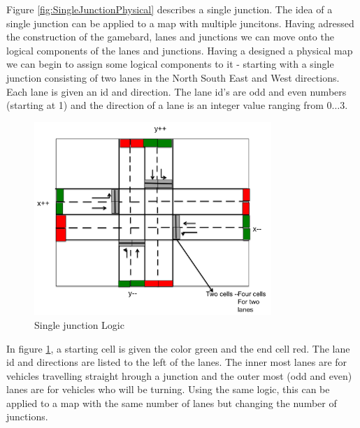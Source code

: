 Figure \ref{fig:SingleJunctionPhysical} describes a single junction. The idea of a single junction can be applied to a map with multiple juncitons. Having adressed the construction of the gamebard, lanes and junctions we can move onto the logical components of the lanes and junctions. \newline
\indent Having a designed a physical map we can begin to assign some logical components to it - starting with a single junction consisting of two lanes in the North South East and West directions. Each lane is given an id and direction. The lane id's are odd and even numbers (starting at 1) and the direction of a lane is an integer value ranging from $ 0 \dots 3 $. 
\begin{figure}[H]
    \centering
    \includegraphics[width=0.8\textwidth]{pics/map2.png}
    \caption{Single junction Logic} 
    \label{fig:SingleJunction}
\end{figure}
In figure \ref{fig:SingleJunction}, a starting cell is given the color green and the end cell red. The lane id and directions are listed to the left of the lanes. The inner most lanes are for vehicles travelling straight hrough a junction and the outer most (odd and even) lanes are for vehicles who will be turning. Using the same logic, this can be applied to a map with the same number of lanes but changing the number of junctions.\newline
